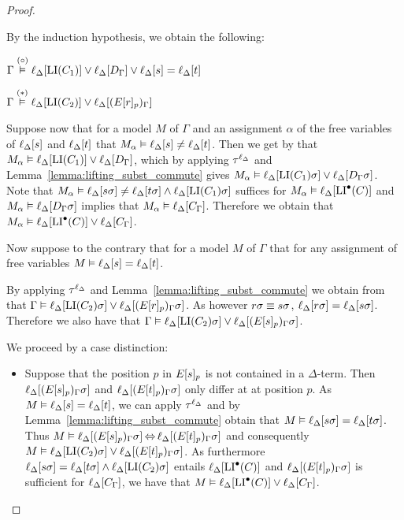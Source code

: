 \begin{proof}
\begin{description}
			By the induction hypothesis, we obtain the following: 

			$\Gamma \stackrel{(\circ)}{\vDash} \ell_{\Delta}[\operatorname{LI}(C_1)] \lor \ell_{\Delta}[D_\Gamma] \lor \ell_{\Delta}[s]=\ell_{\Delta}[t]$

			$\Gamma \stackrel{(*)}{\vDash} \ell_{\Delta}[\operatorname{LI}(C_2)] \lor \ell_{\Delta}[(E{[r]_{p}})_\Gamma]$

			Suppose now that for a model $M$ of $\Gamma$ and an assignment $\alpha$ of the free variables of $\ell_{\Delta}[s]$ and $\ell_{\Delta}[t]$ that $M_\alpha \vDash \ell_{\Delta}[s]\neq \ell_{\Delta}[t]$.
			Then we get by \markA{} that $M_\alpha \vDash \ell_{\Delta}[\operatorname{LI}(C_1)] \lor \ell_{\Delta}[D_\Gamma]$, which by applying $\tau^{\ell_\Delta}$ and Lemma~\ref{lemma:lifting_subst_commute} gives $M_\alpha \vDash \ell_{\Delta}[\operatorname{LI}(C_1)\sigma] \lor \ell_{\Delta}[D_\Gamma\sigma]$.
			Note that $M_\alpha \vDash \ell_{\Delta}[s\sigma]\neq \ell_{\Delta}[t\sigma] \land \ell_{\Delta}[\operatorname{LI}(C_1)\sigma]$ suffices for $M_\alpha \vDash \ell_{\Delta}[\operatorname{LI}^\bullet(C)]$ and $M_\alpha \vDash \ell_{\Delta}[D_\Gamma\sigma]$ implies that $M_\alpha \vDash \ell_{\Delta}[C_\Gamma]$.
			Therefore we obtain that 
			$M_\alpha \vDash \ell_{\Delta}[\operatorname{LI}^\bullet(C)] \lor \ell_{\Delta}[C_\Gamma]$.

			Now suppose to the contrary that for a model $M$ of $\Gamma$ that for any assignment of free variables $M \entails \lifdeltanovar{s}\nolinebreak=\lifdeltanovar{t}$.

			By applying $\tau^{\ell_\Delta}$ and  Lemma~\ref{lemma:lifting_subst_commute} we obtain from \markB{} that
			$\Gamma \vDash \ell_{\Delta}[\operatorname{LI}(C_2)\sigma] \lor \ell_{\Delta}[(E{[r]_{p}})_\Gamma\sigma]$.
			As however $r\sigma \equiv s\sigma$,
			$\ell_{\Delta}[r\sigma] = \ell_{\Delta}[s\sigma]$.
			Therefore we also have that 
			$\Gamma \vDash \ell_{\Delta}[\operatorname{LI}(C_2)\sigma] \lor \ell_{\Delta}[(E{[s]_{p}})_\Gamma\sigma]$.

			We proceed by a case distinction:
			\begin{itemize}
				\item Suppose that the position $p$ in $E{[s]_{p}}$ is not contained in a $\Delta$-term.
					Then
					$\ell_{\Delta}[(E{[s]_{p}})_\Gamma\sigma]$
					and
					$\ell_{\Delta}[(E{[t]_{p}})_\Gamma\sigma]$
					only differ at at position $p$.
					As $M \vDash \ell_{\Delta}[s] = \ell_{\Delta}[t]$, we can apply $\tau^{\ell_\Delta}$ and by Lemma~\ref{lemma:lifting_subst_commute} obtain that 
					$M \vDash \ell_{\Delta}[s\sigma] = \ell_{\Delta}[t\sigma]$.
					Thus
					$M\vDash \ell_{\Delta}[(E{[s]_{p}})_\Gamma\sigma] \operatorname{\Leftrightarrow} 
					\ell_{\Delta}[(E{[t]_{p}})_\Gamma\sigma]$
					and consequently
					$M \vDash \ell_{\Delta}[\operatorname{LI}(C_2)\sigma] \lor \ell_{\Delta}[(E{[t]_{p}})_\Gamma\sigma]$.
					As furthermore $\ell_{\Delta}[s\sigma] =\ell_{\Delta}[t\sigma] \land \ell_{\Delta}[\operatorname{LI}(C_2)\sigma]$ entails $\ell_{\Delta}[\operatorname{LI}^\bullet(C)]$
					and $\ell_{\Delta}[(E{[t]_{p}})_\Gamma\sigma]$ is sufficient for $\ell_{\Delta}[C_\Gamma]$,
					we have that 
					$M\vDash \ell_{\Delta}[\operatorname{LI}^\bullet(C)] \lor \ell_{\Delta}[C_\Gamma]$.


\end{itemize}
\end{description}
\end{proof}
